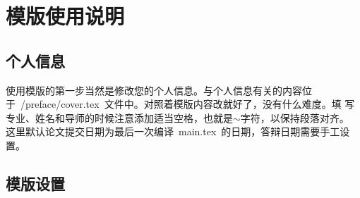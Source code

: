
%
%
%

\chapter{模版使用说明}
\label{chap03}

\section{个人信息}
使用模版的第一步当然是修改您的个人信息。与个人信息有关的内容位
于~{/preface/cover.tex}~文件中。对照着模版内容改就好了，没有什么难度。填
写专业、姓名和导师的时候注意添加适当空格，也就是$\sim$字符，以保持段落对齐。
这里默认论文提交日期为最后一次编译~main.tex~的日期，答辩日期需要手工设置。

\section{模版设置}

